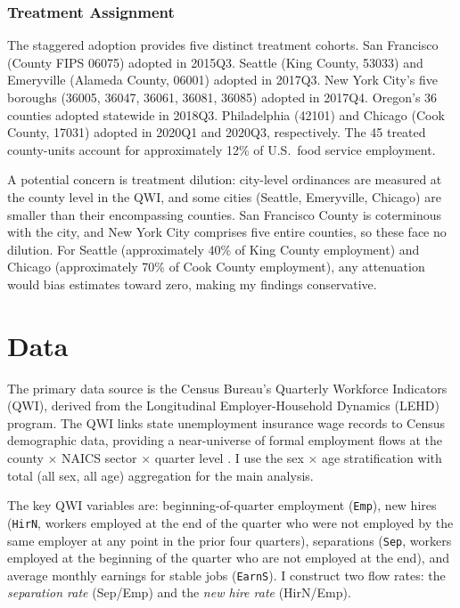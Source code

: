 \documentclass[12pt]{article}
\begin{document}
\subsubsection*{Treatment Assignment} The staggered adoption provides five distinct treatment cohorts. San Francisco (County FIPS 06075) adopted in 2015Q3. Seattle (King County, 53033) and Emeryville (Alameda County, 06001) adopted in 2017Q3. New York City's five boroughs (36005, 36047, 36061, 36081, 36085) adopted in 2017Q4. Oregon's 36 counties adopted statewide in 2018Q3. Philadelphia (42101) and Chicago (Cook County, 17031) adopted in 2020Q1 and 2020Q3, respectively. The 45 treated county-units account for approximately 12\% of U.S.\ food service employment.

A potential concern is treatment dilution: city-level ordinances are measured at the county level in the QWI, and some cities (Seattle, Emeryville, Chicago) are smaller than their encompassing counties. San Francisco County is coterminous with the city, and New York City comprises five entire counties, so these face no dilution. For Seattle (approximately 40\% of King County employment) and Chicago (approximately 70\% of Cook County employment), any attenuation would bias estimates toward zero, making my findings conservative.

\section{Data}

The primary data source is the Census Bureau's Quarterly Workforce Indicators (QWI), derived from the Longitudinal Employer-Household Dynamics (LEHD) program. The QWI links state unemployment insurance wage records to Census demographic data, providing a near-universe of formal employment flows at the county $\times$ NAICS sector $\times$ quarter level \citep{abowd2009lehd}. I use the sex $\times$ age stratification with total (all sex, all age) aggregation for the main analysis.

The key QWI variables are: beginning-of-quarter employment (\texttt{Emp}), new hires (\texttt{HirN}, workers employed at the end of the quarter who were not employed by the same employer at any point in the prior four quarters), separations (\texttt{Sep}, workers employed at the beginning of the quarter who are not employed at the end), and average monthly earnings for stable jobs (\texttt{EarnS}). I construct two flow rates: the \emph{separation rate} (Sep/Emp) and the \emph{new hire rate} (HirN/Emp).
\end{document}
